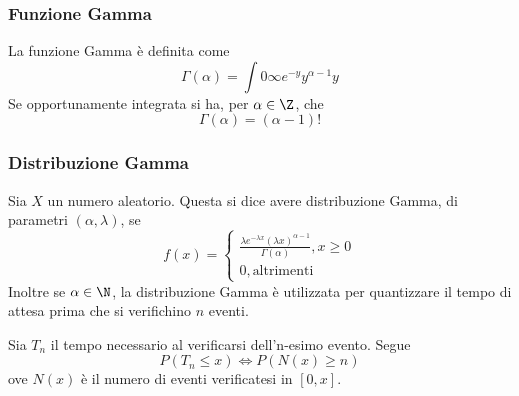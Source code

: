 \documentclass{subfiles}
\begin{document}
\subsubsection*{Funzione Gamma}
La funzione Gamma è definita come
\[
    \Gamma(\alpha) = \int{0}{\infty}{e^{-y}y^{\alpha - 1}}{y}
\]
Se opportunamente integrata si ha, per \(\alpha \in \Z\), che
\[
    \Gamma(\alpha) = (\alpha - 1)!
\]

\subsubsection*{Distribuzione Gamma}
Sia \(X\) un numero aleatorio. Questa si dice avere distribuzione Gamma, di parametri \((\alpha, \lambda)\), se
\[f(x) = \begin{cases}
        \frac{\lambda e^{-\lambda x} (\lambda x)^{\alpha - 1}}{\Gamma(\alpha)}, x \ge 0 \\
        0, \text{altrimenti}
    \end{cases}\]
Inoltre se \(\alpha \in \N\), la distribuzione Gamma è utilizzata per quantizzare il tempo di attesa prima che si verifichino \(n\) eventi.

Sia \(T_{n}\) il tempo necessario al verificarsi dell'n-esimo evento. Segue
\[
    P(T_{n} \le x) \iff P(N(x) \ge n)
\]
ove \(N(x)\) è il numero di eventi verificatesi in \([0, x]\).\\
\end{document}
